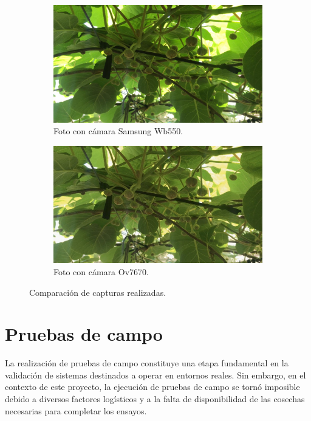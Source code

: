 \begin{figure}[!htpb]
     \centering
     \begin{subfigure}[b]{1.0\textwidth}
         \centering
         \includegraphics[width=.80\textwidth]{./Figures/kiwi_samsung.jpg}
         \caption{Foto con cámara Samsung Wb550.}
         \label{fig:1de2}
     \end{subfigure}
     \hfill
     \begin{subfigure}[b]{1.0\textwidth}
         \centering
         \includegraphics[width=.80\textwidth]{./Figures/kiwi_Ov7670.jpg}
         \caption{Foto con cámara Ov7670.}
         \label{fig:2de2}
     \end{subfigure}
     \hfill

        \caption{Comparación de capturas realizadas.}
        \label{fig:comparacion_fotos}
\end{figure}

\section{Pruebas de campo}
\label{pruebas_de_campo}

La realización de pruebas de campo constituye una etapa fundamental en la validación de sistemas destinados a operar en entornos reales. Sin embargo, en el contexto de este proyecto, la ejecución de pruebas de campo se tornó imposible debido a diversos factores logísticos y a la falta de disponibilidad de las cosechas necesarias para completar los ensayos.

